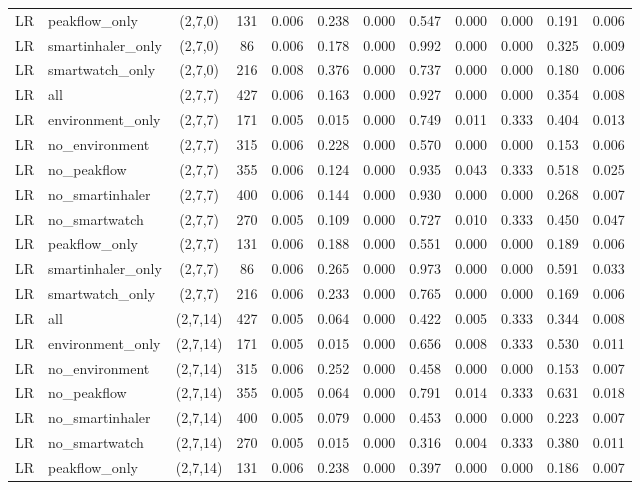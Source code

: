 \begin{longtable}{llcccccccccc}
LR & peakflow\_only & (2,7,0) & 131 & 0.006 & 0.238 & 0.000 & 0.547 & 0.000 & 0.000 & 0.191 & 0.006 \\
LR & smartinhaler\_only & (2,7,0) & 86 & 0.006 & 0.178 & 0.000 & 0.992 & 0.000 & 0.000 & 0.325 & 0.009 \\
LR & smartwatch\_only & (2,7,0) & 216 & 0.008 & 0.376 & 0.000 & 0.737 & 0.000 & 0.000 & 0.180 & 0.006 \\
LR & all & (2,7,7) & 427 & 0.006 & 0.163 & 0.000 & 0.927 & 0.000 & 0.000 & 0.354 & 0.008 \\
LR & environment\_only & (2,7,7) & 171 & 0.005 & 0.015 & 0.000 & 0.749 & 0.011 & 0.333 & 0.404 & 0.013 \\
LR & no\_environment & (2,7,7) & 315 & 0.006 & 0.228 & 0.000 & 0.570 & 0.000 & 0.000 & 0.153 & 0.006 \\
LR & no\_peakflow & (2,7,7) & 355 & 0.006 & 0.124 & 0.000 & 0.935 & 0.043 & 0.333 & 0.518 & 0.025 \\
LR & no\_smartinhaler & (2,7,7) & 400 & 0.006 & 0.144 & 0.000 & 0.930 & 0.000 & 0.000 & 0.268 & 0.007 \\
LR & no\_smartwatch & (2,7,7) & 270 & 0.005 & 0.109 & 0.000 & 0.727 & 0.010 & 0.333 & 0.450 & 0.047 \\
LR & peakflow\_only & (2,7,7) & 131 & 0.006 & 0.188 & 0.000 & 0.551 & 0.000 & 0.000 & 0.189 & 0.006 \\
LR & smartinhaler\_only & (2,7,7) & 86 & 0.006 & 0.265 & 0.000 & 0.973 & 0.000 & 0.000 & 0.591 & 0.033 \\
LR & smartwatch\_only & (2,7,7) & 216 & 0.006 & 0.233 & 0.000 & 0.765 & 0.000 & 0.000 & 0.169 & 0.006 \\
LR & all & (2,7,14) & 427 & 0.005 & 0.064 & 0.000 & 0.422 & 0.005 & 0.333 & 0.344 & 0.008 \\
LR & environment\_only & (2,7,14) & 171 & 0.005 & 0.015 & 0.000 & 0.656 & 0.008 & 0.333 & 0.530 & 0.011 \\
LR & no\_environment & (2,7,14) & 315 & 0.006 & 0.252 & 0.000 & 0.458 & 0.000 & 0.000 & 0.153 & 0.007 \\
LR & no\_peakflow & (2,7,14) & 355 & 0.005 & 0.064 & 0.000 & 0.791 & 0.014 & 0.333 & 0.631 & 0.018 \\
LR & no\_smartinhaler & (2,7,14) & 400 & 0.005 & 0.079 & 0.000 & 0.453 & 0.000 & 0.000 & 0.223 & 0.007 \\
LR & no\_smartwatch & (2,7,14) & 270 & 0.005 & 0.015 & 0.000 & 0.316 & 0.004 & 0.333 & 0.380 & 0.011 \\
LR & peakflow\_only & (2,7,14) & 131 & 0.006 & 0.238 & 0.000 & 0.397 & 0.000 & 0.000 & 0.186 & 0.007 \\

\end{longtable}

